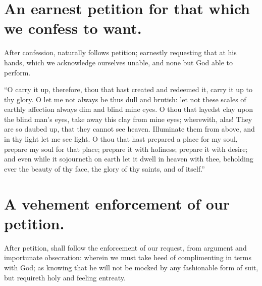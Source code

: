\section{An earnest petition for that which we confess to want.}

After confession, naturally follows petition; earnestly requesting that at his hands, which we acknowledge ourselves unable, and none but God able to perform. 

``O carry it up, therefore, thou that hast created and redeemed it, carry it up to thy glory. O let me not always be thus dull and brutish: let not these scales of earthly affection always dim and blind mine eyes. O thou that layedst clay upon the blind man's eyes, take away this clay from mine eyes; wherewith, alas! They are so daubed up, that they cannot see heaven. Illuminate them from above, and in thy light let me see light. O thou that hast prepared a place for my soul, prepare my soul for that place; prepare it with holiness; prepare it with desire; and even while it sojourneth on earth let it dwell in heaven with thee, beholding ever the beauty of thy face, the glory of thy saints, and of itself.''

\section{A vehement enforcement of our petition.}

After petition, shall follow the enforcement of our request, from argument and importunate obsecration: wherein we must take heed of complimenting in terms with God; as knowing that he will not be mocked by any fashionable form of suit, but requireth holy and feeling entreaty. 

